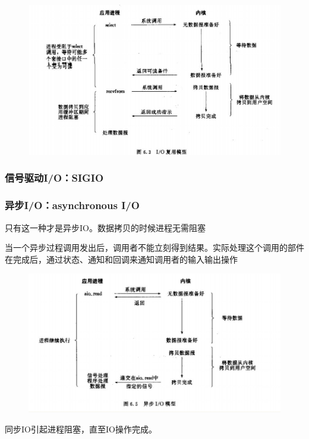 \documentclass[UTF8,a4paper,8pt]{ctexbook}
\begin{document}
			\begin{figure}[h]
				\centering
				\includegraphics[scale = 0.8]{IOMultiplexing.jpg}
			\end{figure}
			\subsubsection{信号驱动I/O：SIGIO}
			
			\subsubsection{异步I/O：asynchronous I/O}只有这一种才是异步IO。数据拷贝的时候进程无需阻塞
			
			当一个异步过程调用发出后，调用者不能立刻得到结果。实际处理这个调用的部件在完成后，通过状态、通知和回调来通知调用者的输入输出操作
			
			\begin{figure}[h]
				\centering
				\includegraphics[scale = 0.8]{asyIO.jpg}
			\end{figure}
			
			同步IO引起进程阻塞，直至IO操作完成。
			
\end{document}
